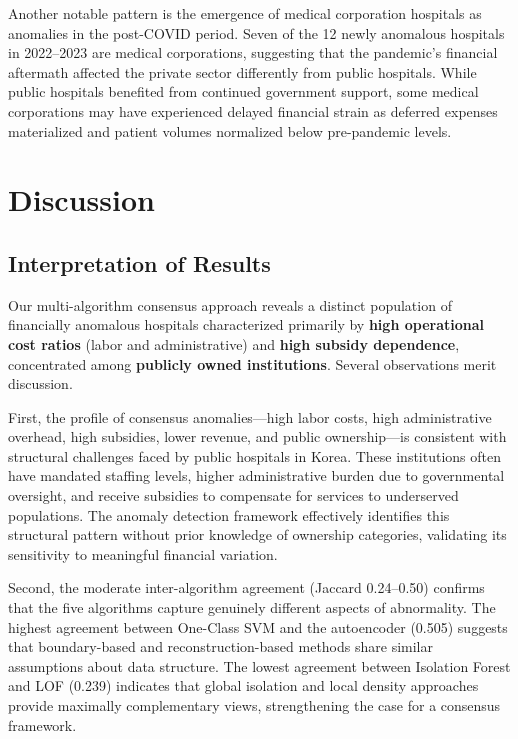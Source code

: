 \documentclass{ieeeaccess}
\begin{document}
Another notable pattern is the emergence of medical corporation hospitals as anomalies in the post-COVID period. Seven of the 12 newly anomalous hospitals in 2022--2023 are medical corporations, suggesting that the pandemic's financial aftermath affected the private sector differently from public hospitals. While public hospitals benefited from continued government support, some medical corporations may have experienced delayed financial strain as deferred expenses materialized and patient volumes normalized below pre-pandemic levels.

\section{Discussion}
\label{sec:discussion}

\subsection{Interpretation of Results}

Our multi-algorithm consensus approach reveals a distinct population of financially anomalous hospitals characterized primarily by \textbf{high operational cost ratios} (labor and administrative) and \textbf{high subsidy dependence}, concentrated among \textbf{publicly owned institutions}. Several observations merit discussion.

First, the profile of consensus anomalies---high labor costs, high administrative overhead, high subsidies, lower revenue, and public ownership---is consistent with structural challenges faced by public hospitals in Korea. These institutions often have mandated staffing levels, higher administrative burden due to governmental oversight, and receive subsidies to compensate for services to underserved populations. The anomaly detection framework effectively identifies this structural pattern without prior knowledge of ownership categories, validating its sensitivity to meaningful financial variation.

Second, the moderate inter-algorithm agreement (Jaccard 0.24--0.50) confirms that the five algorithms capture genuinely different aspects of abnormality. The highest agreement between One-Class SVM and the autoencoder (0.505) suggests that boundary-based and reconstruction-based methods share similar assumptions about data structure. The lowest agreement between Isolation Forest and LOF (0.239) indicates that global isolation and local density approaches provide maximally complementary views, strengthening the case for a consensus framework.
\end{document}
